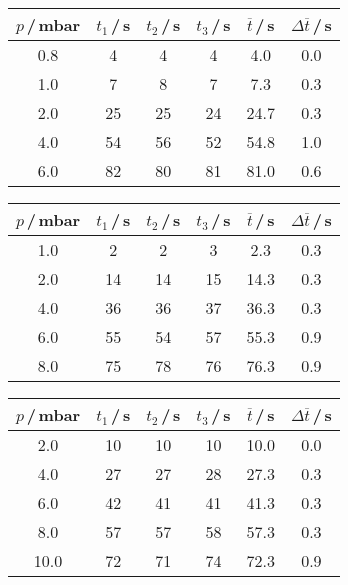 \begin{table}[H]
  \begin{subtable}{0.45\textwidth}
    \hspace{-1.2cm}
    \begin{tabular}{c|c|c|c|c|c}\label{tab:Leck0.6Dreh}
      $p$\,/\,mbar & $t_1$\,/\,s & $t_2$\,/\,s & $t_3$\,/\,s & $\overline{t}$\,/\,s & $\Delta \overline{t}$\,/\,s \\
      \midrule
      0.8 & 4  & 4  & 4  & 4.0  & 0.0 \\
      1.0 & 7  & 8  & 7  & 7.3  & 0.3 \\
      2.0 & 25 & 25 & 24 & 24.7 & 0.3 \\
      4.0 & 54 & 56 & 52 & 54.8 & 1.0 \\
      6.0 & 82 & 80 & 81 & 81.0 & 0.6 \\
    \end{tabular}
  \end{subtable}\hfill
  \begin{subtable}{0.45\textwidth}
    \hspace{-0.5cm}
    \begin{tabular}{c|c|c|c|c|c}\label{tab:Leck0.8Dreh}
      $p$\,/\,mbar & $t_1$\,/\,s & $t_2$\,/\,s & $t_3$\,/\,s & $\overline{t}$\,/\,s & $\Delta \overline{t}$\,/\,s \\
      \midrule
      1.0 & 2  & 2  & 3  & 2.3  & 0.3 \\
      2.0 & 14 & 14 & 15 & 14.3 & 0.3 \\
      4.0 & 36 & 36 & 37 & 36.3 & 0.3 \\
      6.0 & 55 & 54 & 57 & 55.3 & 0.9 \\
      8.0 & 75 & 78 & 76 & 76.3 & 0.9 \\
    \end{tabular}
  \end{subtable}

  \vspace{1cm}
  \begin{subtable}{0.45\textwidth}
    \hspace{-1.2cm}
    \begin{tabular}{c|c|c|c|c|c}\label{tab:Leck1.0Dreh}
      $p$\,/\,mbar & $t_1$\,/\,s & $t_2$\,/\,s & $t_3$\,/\,s & $\overline{t}$\,/\,s & $\Delta \overline{t}$\,/\,s \\
      \midrule
      2.0  & 10 & 10 & 10 & 10.0 & 0.0 \\
      4.0  & 27 & 27 & 28 & 27.3 & 0.3 \\
      6.0  & 42 & 41 & 41 & 41.3 & 0.3 \\
      8.0  & 57 & 57 & 58 & 57.3 & 0.3 \\
      10.0 & 72 & 71 & 74 & 72.3 & 0.9 \\
    \end{tabular}
  \end{subtable}
\end{table}

